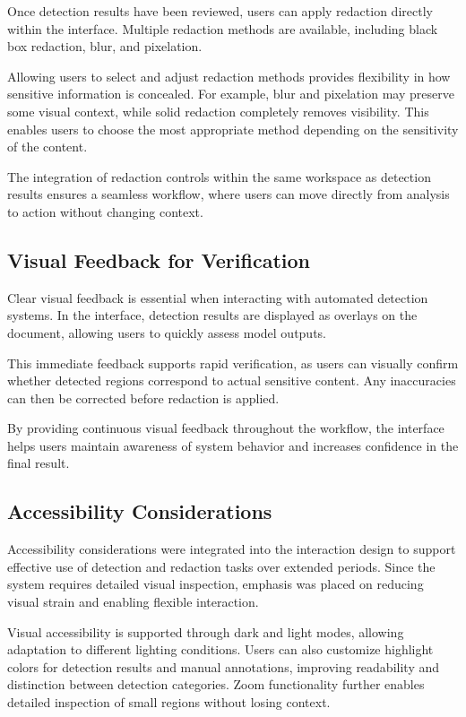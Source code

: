 Once detection results have been reviewed, users can apply redaction directly within the interface. Multiple redaction methods are available, including black box redaction, blur, and pixelation.

Allowing users to select and adjust redaction methods provides flexibility in how sensitive information is concealed. For example, blur and pixelation may preserve some visual context, while solid redaction completely removes visibility. This enables users to choose the most appropriate method depending on the sensitivity of the content.

The integration of redaction controls within the same workspace as detection results ensures a seamless workflow, where users can move directly from analysis to action without changing context.

\subsection{Visual Feedback for Verification}

Clear visual feedback is essential when interacting with automated detection systems. In the interface, detection results are displayed as overlays on the document, allowing users to quickly assess model outputs.

This immediate feedback supports rapid verification, as users can visually confirm whether detected regions correspond to actual sensitive content. Any inaccuracies can then be corrected before redaction is applied.

By providing continuous visual feedback throughout the workflow, the interface helps users maintain awareness of system behavior and increases confidence in the final result.

\subsection{Accessibility Considerations}

Accessibility considerations were integrated into the interaction design to support effective use of detection and redaction tasks over extended periods. Since the system requires detailed visual inspection, emphasis was placed on reducing visual strain and enabling flexible interaction.

Visual accessibility is supported through dark and light modes, allowing adaptation to different lighting conditions. Users can also customize highlight colors for detection results and manual annotations, improving readability and distinction between detection categories. Zoom functionality further enables detailed inspection of small regions without losing context.

